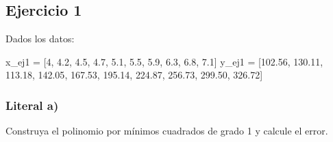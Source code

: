 \documentclass[
  letterpaper,
  DIV=11,
  numbers=noendperiod]{scrartcl}
\newenvironment{Shaded}{\begin{snugshade}}{\end{snugshade}}
\newcommand{\DecValTok}[1]{\textcolor[rgb]{0.68,0.00,0.00}{#1}}
\newcommand{\FloatTok}[1]{\textcolor[rgb]{0.68,0.00,0.00}{#1}}
\newcommand{\NormalTok}[1]{\textcolor[rgb]{0.00,0.23,0.31}{#1}}
\newcommand{\OperatorTok}[1]{\textcolor[rgb]{0.37,0.37,0.37}{#1}}
\begin{document}
\subsection{Ejercicio 1}\label{ejercicio-1}

Dados los datos:

\begin{Shaded}
\begin{Highlighting}[]
\NormalTok{x\_ej1 }\OperatorTok{=}\NormalTok{ [}\DecValTok{4}\NormalTok{, }\FloatTok{4.2}\NormalTok{, }\FloatTok{4.5}\NormalTok{, }\FloatTok{4.7}\NormalTok{, }\FloatTok{5.1}\NormalTok{, }\FloatTok{5.5}\NormalTok{, }\FloatTok{5.9}\NormalTok{, }\FloatTok{6.3}\NormalTok{, }\FloatTok{6.8}\NormalTok{, }\FloatTok{7.1}\NormalTok{]}
\NormalTok{y\_ej1 }\OperatorTok{=}\NormalTok{ [}\FloatTok{102.56}\NormalTok{, }\FloatTok{130.11}\NormalTok{, }\FloatTok{113.18}\NormalTok{, }\FloatTok{142.05}\NormalTok{, }\FloatTok{167.53}\NormalTok{, }\FloatTok{195.14}\NormalTok{, }\FloatTok{224.87}\NormalTok{, }\FloatTok{256.73}\NormalTok{, }\FloatTok{299.50}\NormalTok{, }\FloatTok{326.72}\NormalTok{]}
\end{Highlighting}
\end{Shaded}

\subsubsection{Literal a)}\label{literal-a}

Construya el polinomio por mínimos cuadrados de grado 1 y calcule el
error.
\end{document}
